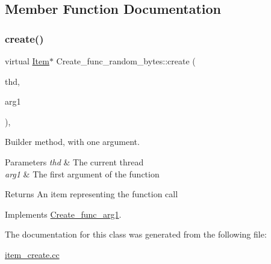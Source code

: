 \subsection{Member Function Documentation}
\mbox{\label{classCreate__func__random__bytes_a54d9295e4ce75cb3cb0a9fb9a2d2f359}} 
\subsubsection{\texorpdfstring{create()}{create()}}
{\footnotesize\ttfamily virtual \mbox{\hyperlink{classItem}{Item}}$\ast$ Create\+\_\+func\+\_\+random\+\_\+bytes\+::create (\begin{DoxyParamCaption}\item[{T\+HD $\ast$}]{thd,  }\item[{\mbox{\hyperlink{classItem}{Item}} $\ast$}]{arg1 }\end{DoxyParamCaption})\hspace{0.3cm}{\ttfamily [inline]}, {\ttfamily [virtual]}}

Builder method, with one argument. 
\begin{DoxyParams}{Parameters}
{\em thd} & The current thread \\
\hline
{\em arg1} & The first argument of the function \\
\hline
\end{DoxyParams}
\begin{DoxyReturn}{Returns}
An item representing the function call 
\end{DoxyReturn}


Implements \mbox{\hyperlink{classCreate__func__arg1_a3e9a98f755cd82c3e762e334c955a8c9}{Create\+\_\+func\+\_\+arg1}}.



The documentation for this class was generated from the following file\+:\begin{DoxyCompactItemize}
\item 
\mbox{\hyperlink{item__create_8cc}{item\+\_\+create.\+cc}}\end{DoxyCompactItemize}
